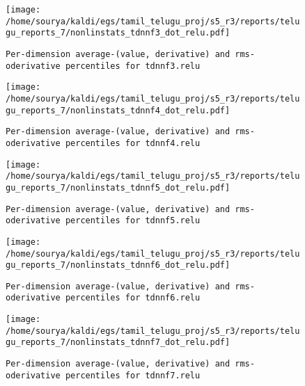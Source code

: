 \documentclass[prl,10pt,twocolumn]{revtex4}
\begin{document}
\newpage
\begin{figure}[h]
  \begin{center}
    \caption{\texttt{Per-dimension average-(value, derivative) and rms-oderivative percentiles for tdnnf3.relu}}
    \texttt{[image: /home/sourya/kaldi/egs/tamil\_telugu\_proj/s5\_r3/reports/telugu\_reports\_7/nonlinstats\_tdnnf3\_dot\_relu.pdf]}
  \end{center}
\end{figure}
\clearpage


\newpage
\begin{figure}[h]
  \begin{center}
    \caption{\texttt{Per-dimension average-(value, derivative) and rms-oderivative percentiles for tdnnf4.relu}}
    \texttt{[image: /home/sourya/kaldi/egs/tamil\_telugu\_proj/s5\_r3/reports/telugu\_reports\_7/nonlinstats\_tdnnf4\_dot\_relu.pdf]}
  \end{center}
\end{figure}
\clearpage


\newpage
\begin{figure}[h]
  \begin{center}
    \caption{\texttt{Per-dimension average-(value, derivative) and rms-oderivative percentiles for tdnnf5.relu}}
    \texttt{[image: /home/sourya/kaldi/egs/tamil\_telugu\_proj/s5\_r3/reports/telugu\_reports\_7/nonlinstats\_tdnnf5\_dot\_relu.pdf]}
  \end{center}
\end{figure}
\clearpage


\newpage
\begin{figure}[h]
  \begin{center}
    \caption{\texttt{Per-dimension average-(value, derivative) and rms-oderivative percentiles for tdnnf6.relu}}
    \texttt{[image: /home/sourya/kaldi/egs/tamil\_telugu\_proj/s5\_r3/reports/telugu\_reports\_7/nonlinstats\_tdnnf6\_dot\_relu.pdf]}
  \end{center}
\end{figure}
\clearpage


\newpage
\begin{figure}[h]
  \begin{center}
    \caption{\texttt{Per-dimension average-(value, derivative) and rms-oderivative percentiles for tdnnf7.relu}}
    \texttt{[image: /home/sourya/kaldi/egs/tamil\_telugu\_proj/s5\_r3/reports/telugu\_reports\_7/nonlinstats\_tdnnf7\_dot\_relu.pdf]}
  \end{center}
\end{figure}
\clearpage
\end{document}
